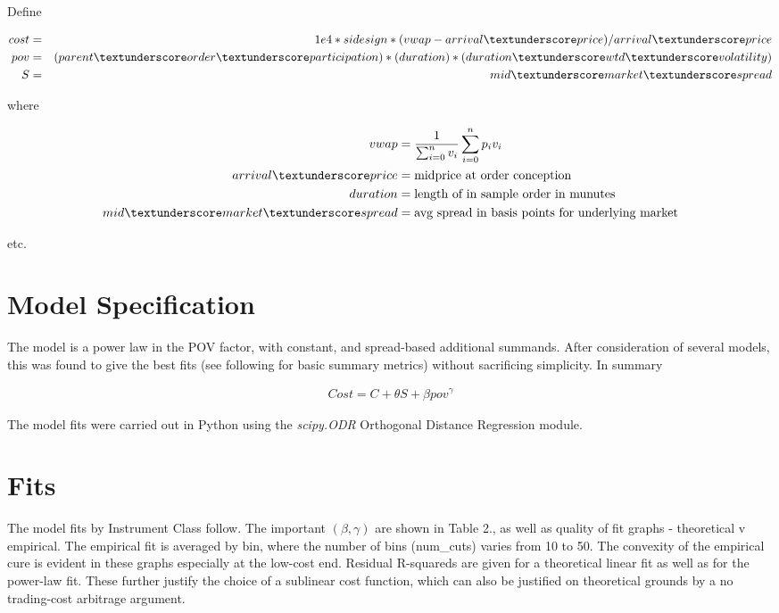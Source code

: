 \documentclass{article}
\begin{document}
Define

\begin{align*}
cost &=& 1e4 * sidesign * (vwap - arrival\textunderscore price)/arrival\textunderscore price\\
pov &=& (parent\textunderscore order\textunderscore participation) * (duration) * (duration\textunderscore wtd\textunderscore volatility)\\
S &=& mid\textunderscore market\textunderscore spread\\
\end{align*}

where

\begin{align*}
vwap &= \frac{1}{\sum_{i=0}^{n}v_i}\sum_{i=0}^{n}p_i v_i\\
arrival\textunderscore price &= \text{midprice at order conception}\\
duration &= \text{length of in sample order in munutes}\\
mid\textunderscore market\textunderscore spread &= \text{avg spread in basis points for underlying market}\\
\end{align*}

etc.

\section*{Model Specification}

The model is a power law in the POV factor, with constant, and spread-based additional summands. After consideration of several models, this was found to give the best fits (see following for basic summary metrics) without sacrificing simplicity. In summary

\begin{align}
Cost = C + \theta S + \beta pov^{\gamma} 
\end{align}

The model fits were carried out in Python using the {\em scipy.ODR} Orthogonal Distance Regression module.

\section*{Fits}

The model fits by Instrument Class follow. The important $\left(\beta , \gamma\right)$  are shown in Table 2., as well as quality of fit graphs - theoretical v empirical. The empirical fit is averaged by bin, where the number of bins (num\_cuts) varies from 10 to 50. The convexity of the empirical cure is evident in these graphs especially at the low-cost end. Residual R-squareds are given for a theoretical linear fit as well as for the power-law fit. These further justify the choice of a sublinear cost function, which can also be justified on theoretical grounds by a no trading-cost arbitrage argument.
\end{document}
